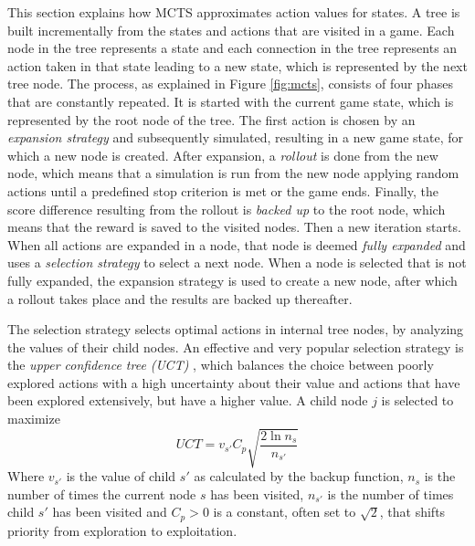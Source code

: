 This section explains how MCTS approximates action values for states.  A tree is
built incrementally from the states and actions that are visited in a game. Each
node in the tree represents a state and each connection in the tree represents
an action taken in that state leading to a new state, which is represented by
the next tree node.  The process, as explained in Figure \ref{fig:mcts},
consists of four phases that are constantly repeated. It is started with the
current game state, which is represented by the root node of the tree. The first
action is chosen by an \emph{expansion strategy} and subsequently simulated,
resulting in a new game state, for which a new node is created. After expansion,
a \emph{rollout} is done from the new node, which means that a simulation is run
from the new node applying random actions until a predefined stop criterion is
met or the game ends. Finally, the score difference resulting from the rollout
is \emph{backed up} to the root node, which means that the reward is saved to the
visited nodes.  Then a new iteration starts. When all actions are expanded in a
node, that node is deemed \emph{fully expanded} and uses a \emph{selection
strategy} to select a next node. When a node is selected that is not fully
expanded, the expansion strategy is used to create a new node, after which a
rollout takes place and the results are backed up thereafter.

The selection strategy selects optimal actions in internal tree nodes, by
analyzing the values of their child nodes. An effective and very popular
selection strategy is the \emph{upper confidence tree (UCT)}
\cite{kocsis2006bandit}, which balances the choice between poorly explored
actions with a high uncertainty about their value and actions that have been
explored extensively, but have a higher value. A child node $j$ is selected to
maximize
\begin{equation}
	\label{eq:uct}
	UCT = v_{s'} C_p \sqrt{\frac{2 \ln n_s}{n_{s'}}}
\end{equation}
Where $v_{s'}$ is the value of child $s'$ as calculated by the backup function,
$n_s$ is the number of times the current node $s$ has been visited, $n_{s'}$ is
the number of times child $s'$ has been visited and $C_p > 0$ is a constant,
often set to $\sqrt{2}$, that shifts priority from exploration to exploitation.

